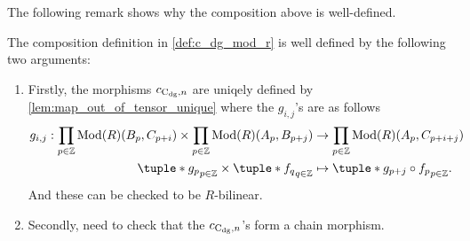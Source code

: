 The following remark shows why the composition above is well-defined.

\begin{remark}
    The composition definition in \autoref{def:c_dg_mod_r} is well defined by the following two arguments:

    \begin{enumerate}
        \item {
            Firstly, the morphisms \( c_{\operatorname{C}_{\operatorname{dg}}, n} \) are uniqely defined by \autoref{lem:map_out_of_tensor_unique} where the \( g_{i, j} \)'s are as follows
            \begin{align*}
                g_{i, j}: \prod_{p \in \Zb} \Mod(R)(B_p, C_{p + i}) \times \prod_{p \in \Zb} \Mod(R)(A_p, B_{p + j}) &\to \prod_{p \in \Zb} \Mod(R)(A_p, C_{p + i + j}) \\
                \tuple*{ g_p }_{p \in \Zb} \times \tuple*{ f_q }_{q \in \Zb} &\mapsto \tuple*{ g_{p + j} \circ f_p }_{p \in \Zb}.
            \end{align*}
            And these can be checked to be \( R \)-bilinear.
        }
        \item {
            Secondly, need to check that the \( c_{\operatorname{C}_{\operatorname{dg}}, n} \)'s form a chain morphism.

}
\end{enumerate}
\end{remark}
